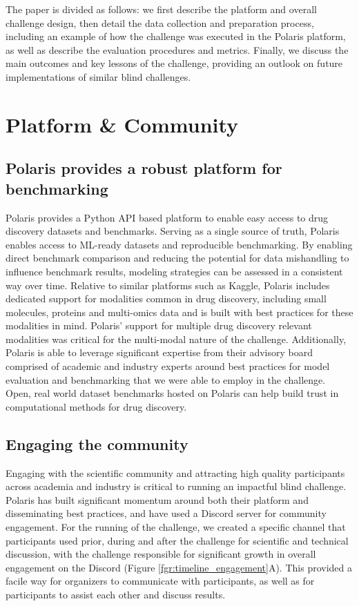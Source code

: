 \documentclass[journal=jcim,manuscript=article]{achemso}
\begin{document}
The paper is divided as follows: we first describe the platform and overall challenge design, then detail the data collection and preparation process, including an example of how the challenge was executed in the Polaris platform, as well as describe the evaluation procedures and metrics. Finally, we discuss the main outcomes and key lessons of the challenge, providing an outlook on future implementations of similar blind challenges.

\section{Platform \& Community}

\subsection{Polaris provides a robust platform for benchmarking}

 Polaris provides a Python API based platform to enable easy access to drug discovery datasets and benchmarks. Serving as a single source of truth, Polaris enables access to ML-ready datasets and reproducible benchmarking. By enabling direct benchmark comparison and reducing the potential for data mishandling to influence benchmark results, modeling strategies can be assessed in a consistent way over time. Relative to similar platforms such as Kaggle, Polaris includes dedicated support for modalities common in drug discovery, including small molecules, proteins and multi-omics data and is built with best practices for these modalities in mind. Polaris' support for multiple drug discovery relevant modalities was critical for the multi-modal nature of the challenge.  Additionally, Polaris is able to leverage significant expertise from their advisory board comprised of academic and industry experts around best practices for model evaluation and benchmarking that we were able to employ in the challenge. Open, real world dataset benchmarks hosted on Polaris can help build trust in computational methods for drug discovery.

\subsection{Engaging the community}

Engaging with the scientific community and attracting high quality participants across academia and industry is critical to running an impactful blind challenge. Polaris has built significant momentum around both their platform and disseminating best practices, and have used a Discord server for community engagement. For the running of the challenge, we created a specific channel  that participants used prior, during and after the challenge for scientific and technical discussion, with the challenge responsible for significant growth in overall engagement on the Discord (Figure \ref{fgr:timeline_engagement}A). This provided a facile way for organizers to communicate with participants, as well as for participants to assist each other and discuss results. 
\end{document}
